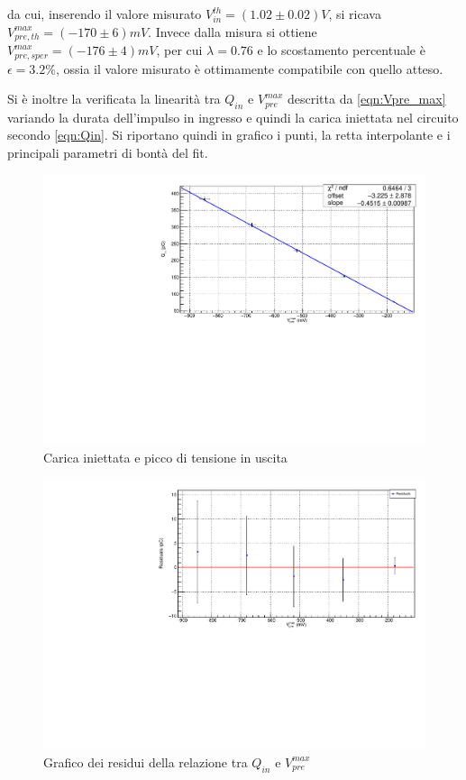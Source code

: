 \documentclass{article}
\begin{document}
da cui, inserendo il valore misurato $V_{in}^{th}=(1.02\pm 0.02) V$, si ricava $V_{pre,th}^{max} =  (-170 \pm 6) mV$. Invece dalla 
misura si ottiene $V_{pre,sper}^{max} = (-176 \pm 4) mV$, per cui $\lambda = 0.76$ e lo scostamento percentuale è $\epsilon = 3.2 \%$, 
ossia il valore misurato è ottimamente compatibile con quello atteso.

Si è inoltre la verificata la linearità tra $Q_{in}$ e $V_{pre}^{max}$ descritta da \ref{eqn:Vpre_max} variando la durata dell'impulso
in ingresso e quindi la carica iniettata nel circuito secondo \ref{eqn:Qin}. Si riportano quindi in grafico i punti, la retta 
interpolante e i principali parametri di bontà del fit. 

\begin{center}
\begin{figure}[H]
\centering
\includegraphics[scale=0.4, angle=0]{fitpreamp.pdf}
\caption{ Carica iniettata e picco di tensione in uscita}
\label{fig:QinvsVpre}
\end{figure}
\end{center}

\begin{center}
\begin{figure}[H]
\centering
\includegraphics[scale=0.4, angle=0]{residuipreamp.pdf}
\caption{Grafico dei residui della relazione tra $Q_{in}$ e $V_{pre}^{max}$}
\label{fig:QinvsVpre_res}
\end{figure}
\end{center}
\end{document}
